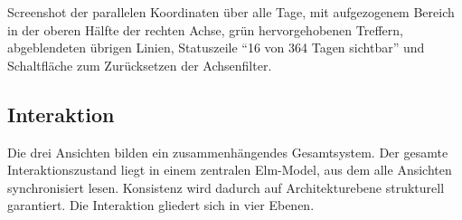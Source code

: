 {Screenshot der parallelen Koordinaten über alle Tage, mit aufgezogenem Bereich in der oberen Hälfte
der rechten Achse, grün hervorgehobenen Treffern, abgeblendeten übrigen Linien, Statuszeile
\enquote{16 von 364 Tagen sichtbar} und Schaltfläche zum Zurücksetzen der Achsenfilter.}

\subsection{Interaktion}\label{sec:interaktion}

Die drei Ansichten bilden ein zusammenhängendes Gesamtsystem. Der gesamte
Interaktionszustand liegt in einem zentralen Elm-Model, aus dem alle Ansichten synchronisiert lesen.
Konsistenz wird dadurch auf Architekturebene strukturell garantiert. Die Interaktion gliedert sich in vier Ebenen.

